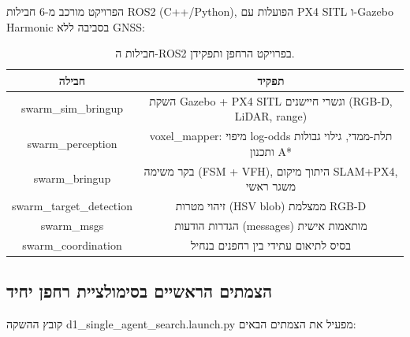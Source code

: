 \documentclass[11pt,a4paper]{article}
\begin{document}
הפרויקט מורכב מ-6 חבילות \textenglish{ROS2 (C++/Python)}, הפועלות עם \textenglish{PX4 SITL} ו-\textenglish{Gazebo Harmonic} בסביבה ללא \textenglish{GNSS}:

\begin{table}[H]
\centering
\begin{tabular}{cc}
\toprule
\textbf{חבילה} & \textbf{תפקיד} \\
\midrule
\textenglish{swarm\_sim\_bringup} & השקת \textenglish{Gazebo + PX4 SITL} וגשרי חיישנים (\textenglish{RGB-D, LiDAR, range}) \\
\textenglish{swarm\_perception} & \textenglish{voxel\_mapper}: מיפוי \textenglish{log-odds} תלת-ממדי, גילוי גבולות ותכנון \textenglish{A*} \\
\textenglish{swarm\_bringup} & בקר משימה (\textenglish{FSM + VFH}), היתוך מיקום \textenglish{SLAM+PX4}, משגר ראשי \\
\textenglish{swarm\_target\_detection} & זיהוי מטרות (\textenglish{HSV blob}) ממצלמת \textenglish{RGB-D} \\
\textenglish{swarm\_msgs} & הגדרות הודעות (\textenglish{messages}) מותאמות אישית \\
\textenglish{swarm\_coordination} & בסיס לתיאום עתידי בין רחפנים בנחיל \\
\bottomrule
\end{tabular}
\caption{חבילות ה-\textenglish{ROS2} בפרויקט הרחפן ותפקידן.}
\label{tab:ros2_packages}
\end{table}

\subsection{הצמתים הראשיים בסימולציית רחפן יחיד}

קובץ ההשקה \textenglish{d1\_single\_agent\_search.launch.py} מפעיל את הצמתים הבאים:
\end{document}
